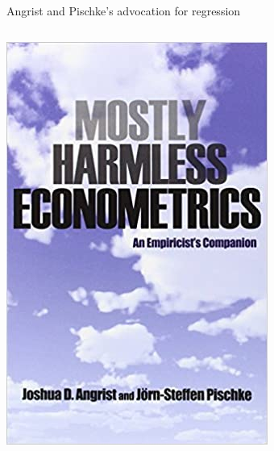 \documentclass[notes,11pt, aspectratio=169]{beamer}
\begin{document}
\begin{frame}{Angrist and Pischke's advocation for regression}
\begin{columns}[T]
\begin{column}{.35\textwidth}
\includegraphics[width=\linewidth]{images/mhe.jpg}
\end{column}%
\end{columns}
\end{frame}
\end{document}
